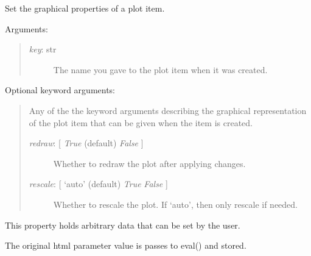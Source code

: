 \documentclass[letterpaper,10pt,english]{sphinxmanual}
\begin{document}
\begin{fulllineitems}
\begin{fulllineitems}
\begin{quote}
\begin{description}
\end{description}
\end{quote}

\end{fulllineitems}


\begin{fulllineitems}
\label{api:mpl.Plot2D.set_properties}
Set the graphical properties of a plot item.

Arguments:
\begin{quote}
\begin{description}
\item[{\emph{key}: str}] \leavevmode
The name you gave to the plot item when it was created.

\end{description}
\end{quote}

Optional keyword arguments:
\begin{quote}

Any of the the keyword arguments describing the graphical representation 
of the plot item that can be given when the item is created.
\begin{description}
\item[{\emph{redraw}: {[} \emph{True}  (default) \textbar{} \emph{False} {]}}] \leavevmode
Whether to redraw the plot after applying changes.

\item[{\emph{rescale}: {[} `auto' (default) \textbar{} \emph{True} \textbar{} \emph{False} {]}}] \leavevmode
Whether to rescale the plot. If `auto', then only rescale if needed.

\end{description}
\end{quote}

\end{fulllineitems}


\begin{fulllineitems}
\label{api:mpl.Plot2D.user}
This property holds arbitrary data that can be set by the user.

The original html parameter value is passes to eval() and stored.

\end{fulllineitems}


\end{fulllineitems}
\end{document}
